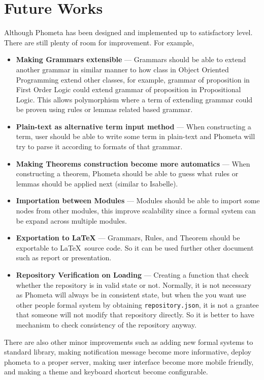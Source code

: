 \documentclass[master.tex]{subfiles}
\begin{document}
\section{Future Works}

Although Phometa has been designed and implemented up to satisfactory level.
There are still plenty of room for improvement. For example,
\begin{itemize}
\item \textbf{Making Grammars extensible} --- Grammars should be able to extend another
  grammar in similar manner to how class in Object Oriented Programming extend
  other classes, for example, grammar of proposition in First Order Logic could
  extend grammar of proposition in Propositional Logic. This allows polymorphism
  where a term of extending grammar could be proven using rules or lemmas
  related based grammar.
\item \textbf{Plain-text as alternative term input method} --- When constructing a term,
  user should be able to write some term in plain-text and Phometa will try to
  parse it according to formats of that grammar.
\item \textbf{Making Theorems construction become more automatics} --- When constructing a
  theorem, Phometa should be able to guess what rules or lemmas should be
  applied next (similar to Isabelle).
\item \textbf{Importation between Modules} --- Modules should be able to import some
  nodes from other modules, this improve scalability since a formal system can
  be expand across multiple modules.
\item \textbf{Exportation to \LaTeX} --- Grammars, Rules, and Theorem should be
  exportable to \LaTeX\ source code. So it can be used further other document
  such as report or presentation.
\item \textbf{Repository Verification on Loading} --- Creating a function that check
  whether the repository is in valid state or not. Normally, it is not necessary
  as Phometa will always be in consistent state, but when the you want use other
  people formal system by obtaining \texttt{repository.json}, it is not a
  grantee that someone will not modify that repository directly. So it is better
  to have mechanism to check consistency of the repository anyway.
\end{itemize}

There are also other minor improvements such as adding new formal systems to
standard library, making notification message become more informative, deploy
phometa to a proper server, making user interface become more mobile friendly,
and making a theme and keyboard shortcut become configurable.
\end{document}

